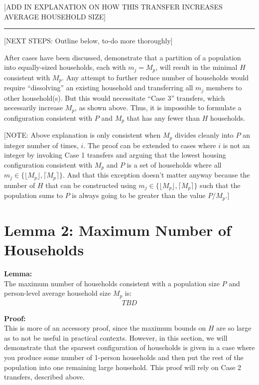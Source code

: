\documentclass[
]{article}
\begin{document}
{[}ADD IN EXPLANATION ON HOW THIS TRANSFER INCREASES AVERAGE HOUSEHOLD
SIZE{]}

\begin{center}\rule{0.5\linewidth}{0.5pt}\end{center}

{[}NEXT STEPS: Outline below, to-do more thoroughly{]}

After cases have been discussed, demonstrate that a partition of a
population into equally-sized households, each with \(m_j = M_p\), will
result in the minimal \(H\) consistent with \(M_p\). Any attempt to
further reduce number of households would require ``dissolving'' an
existing household and transferring all \(m_j\) members to other
household(s). But this would necessitate ``Case 3'' transfers, which
necessarily increase \(M_p\), as shown above. Thus, it is impossible to
formulate a configuration consistent with \(P\) and \(M_p\) that has any
fewer than \(H\) households.

{[}NOTE: Above explanation is only consistent when \(M_p\) divides
cleanly into \(P\) an integer number of times, \(i\). The proof can be
extended to cases where \(i\) is not an integer by invoking Case 1
transfers and arguing that the lowest housing configuration consistent
with \(M_p\) and \(P\) is a set of households where all
\(m_j \in \{ \lfloor M_p \rfloor, \lceil M_p \rceil \}\). And that this
exception doesn't matter anyway because the number of \(H\) that can be
constructed using
\(m_j \in \{ \lfloor M_p \rfloor, \lceil M_p \rceil \}\) such that the
population sums to \(P\) is always going to be greater than the value
\(P / M_p\).{]}

\hypertarget{lemma-2-maximum-number-of-households}{%
\section{Lemma 2: Maximum Number of
Households}\label{lemma-2-maximum-number-of-households}}

\textbf{Lemma:}\\
The maximum number of households consistent with a population size \(P\)
and person-level average household size \(M_p\) is: \begin{align}
TBD
\end{align}

\textbf{Proof:}\\
This is more of an accessory proof, since the maximum bounds on \(H\)
are so large as to not be useful in practical contexts. However, in this
section, we will demonstrate that the sparsest configuration of
households is given in a case where you produce some number of 1-person
households and then put the rest of the population into one remaining
large household. This proof will rely on Case 2 transfers, described
above.
\end{document}
